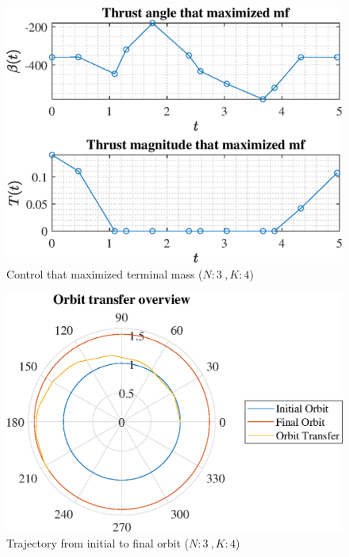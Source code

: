 \documentclass[]{article}
\begin{document}
	\begin{figure}
		\centering
		\includegraphics[scale=0.75]{control_N3_K4_C2_mf.eps}
		\caption{Control that maximized terminal mass (\(N:3\ , K:4\))}
		\label{fig:control_N3_K4_C2_mf}
	\end{figure}
	\begin{figure}
		\centering
		\includegraphics[scale=0.75]{orbit_N3_K4_C2_mf.eps}
		\caption{Trajectory from initial to final orbit (\(N:3\ , K:4\))}
		\label{fig:orbit_N3_K4_C2_mf}
	\end{figure}
\end{document}
